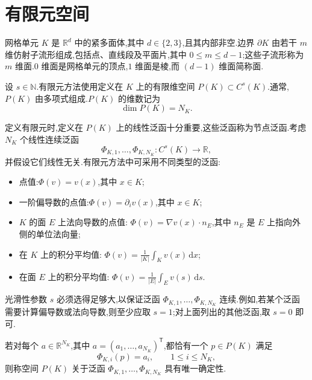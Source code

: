 \section{有限元空间}\label{sec:appendix-b-2}

\begin{note}\label{note:appendix-b-16}
网格单元 $K$ 是 $\mathbb R^d$ 中的紧多面体,其中 $d\in\{2,3\}$,且其内部非空.边界 $\partial K$ 由若干 $m$ 维仿射子流形组成,包括点、直线段及平面片,其中 $0\le m\le d-1$;这些子流形称为 $m$ 维面.$0$ 维面是网格单元的顶点,$1$ 维面是棱,而 $(d-1)$ 维面简称面.
\end{note}

\begin{note}\label{note:appendix-b-17}
设 $s\in\mathbb N$.有限元方法使用定义在 $K$ 上的有限维空间
$P(K)\subset C^s(K)$.通常,$P(K)$ 由多项式组成.$P(K)$ 的维数记为
\[
 \dim P(K)=N_K.
\]
\end{note}

\begin{note}\label{note:appendix-b-18}
定义有限元时,定义在 $P(K)$ 上的线性泛函十分重要,这些泛函称为节点泛函.考虑 $N_K$ 个线性连续泛函
\[
 \Phi_{K,1},\ldots,\Phi_{K,N_K}:C^s(K)\to\mathbb R,
\]
并假设它们线性无关.有限元方法中可采用不同类型的泛函:
\begin{itemize}
 \item 点值:$\Phi(v)=v(x)$,其中 $x\in K$;
 \item 一阶偏导数的点值:$\Phi(v)=\partial_i v(x)$,其中 $x\in K$;
 \item $K$ 的面 $E$ 上法向导数的点值:
       $\Phi(v)=\nabla v(x)\cdot n_E$,其中 $n_E$ 是 $E$ 上指向外侧的单位法向量;
 \item 在 $K$ 上的积分平均值:
       $\displaystyle \Phi(v)=\frac1{|K|}\int_K v(x)\,\mathrm dx$;
 \item 在面 $E$ 上的积分平均值:
       $\displaystyle \Phi(v)=\frac1{|E|}\int_E v(s)\,\mathrm ds$.
\end{itemize}
光滑性参数 $s$ 必须选得足够大,以保证泛函
$\Phi_{K,1},\ldots,\Phi_{K,N_K}$ 连续.例如,若某个泛函需要计算偏导数或法向导数,则至少应取 $s=1$;对上面列出的其他泛函,取 $s=0$ 即可.
\end{note}

\begin{definition}[关于泛函的唯一确定性]\label{def:appendix-b-19}
若对每个 $a\in\mathbb R^{N_K}$,其中
$a=(a_1,\ldots,a_{N_K})^{\mathsf T}$,都恰有一个 $p\in P(K)$ 满足
\[
 \Phi_{K,i}(p)=a_i,\qquad 1\le i\le N_K,
\]
则称空间 $P(K)$ 关于泛函 $\Phi_{K,1},\ldots,\Phi_{K,N_K}$ 具有唯一确定性.
\end{definition}

